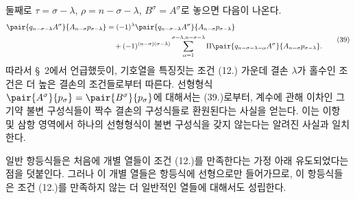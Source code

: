 
둘째로 $\tau=\sigma-\lambda$, $\rho=n-\sigma-\lambda$, $B^\sigma=A^\sigma$로 놓으면 다음이 나온다.
\begin{equation}
\begin{aligned}
\pair{q_{n-\sigma-\lambda}A^\sigma}{A_{n-\sigma}p_{\sigma-\lambda}}
&=(-1)^\lambda\pair{q_{n-\sigma-\lambda}A^\sigma}{A_{n-\sigma}p_{\sigma-\lambda}}\\
&\quad+(-1)^{(n-\sigma)(\sigma-\lambda)}
 \sum_{\alpha=1}^{\sigma-\lambda,n-\sigma-\lambda}
 \Pi\pair{q_{n-\sigma-\lambda-\alpha}A^\sigma}{A_{n-\sigma}p_{\sigma-\lambda}}.
\end{aligned}
\tag{39}
\end{equation}
따라서 \S\ 2에서 언급했듯이, 기호열을 특징짓는 조건 (12.) 가운데 결손 $\lambda$가 홀수인 조건은 더 높은 결손의 조건들로부터 따른다. 선형형식 $\pair{A^\sigma}{p_\sigma}=\pair{B^\sigma}{p_\sigma}$에 대해서는 (39.)로부터, 계수에 관해 이차인 그 기약 불변 구성식들이 짝수 결손의 구성식들로 환원된다는 사실을 얻는다. 이는 이항 및 삼항 영역에서 하나의 선형형식이 불변 구성식을 갖지 않는다는 알려진 사실과 일치한다.

일반 항등식들은 처음에 개별 열들이 조건 (12.)를 만족한다는 가정 아래 유도되었다는 점을 덧붙인다. 그러나 이 개별 열들은 항등식에 선형으로만 들어가므로, 이 항등식들은 조건 (12.)를 만족하지 않는 더 일반적인 열들에 대해서도 성립한다.
